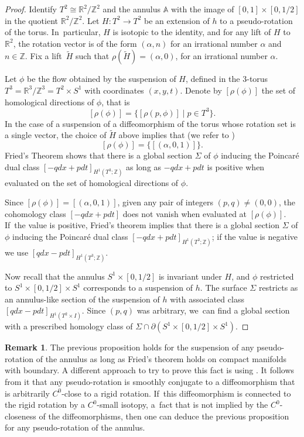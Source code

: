 \documentclass[10pt]{amsart}
\theoremstyle{definition}
\newtheorem{Remark}[theorem]{Remark}
\begin{document}
\begin{proof}
Identify $T^2\cong \mathbb{R}^2/\mathbb{Z}^2$ and the annulus $\mathbb{A}$ with the image of $[0,1]\times [0,1/2]$ in the quotient $\mathbb{R}^2/\mathbb{Z}^2$. Let $H: T^2 \to T^2$
be an extension of $h$ to a pseudo-rotation of the torus. In~particular, $H$ is isotopic to the identity, and for any lift of $H$ to $\mathbb{R}^2$, the rotation vector is of the form $(\alpha,n)$ for an irrational number $\alpha$ and $n\in \mathbb{Z}$. Fix a lift~$\widetilde H$ such that $\rho(\widetilde H)=(\alpha,0)$, for an irrational number $\alpha$.

Let $\phi$ be the flow obtained by the suspension of $H$, defined in the 3-torus $T^3=\mathbb{R}^3/\mathbb{Z}^3=T^2\times S^1$ with coordinates $(x,y,t)$.
Denote by $[\rho(\phi)]$ the set of homological directions of $\phi$, that is
\[
[\rho(\phi)]=\{ [\rho(p,\phi)]\mid p\in T^3\}.
\]
In the case of a suspension of a diffeomorphism of the torus whose rotation set is a single vector, the choice of $\widetilde H$ above implies that (we refer to \cite[Eq.\,2.2]{K1})
\[
[\rho(\phi)]=\{[(\alpha,0,1)]\}.
\]
Fried's Theorem \cite[Th.\,D]{Fr} shows that there is a global section $\Sigma$ of $\phi$ inducing the Poincaré dual class $[-qdx+pdt]_{H^1(T^3;\mathbb{Z})}$ as long as $-qdx+pdt$ is positive when evaluated on the set of homological directions of $\phi$.

{Since $[\rho(\phi)]=[(\alpha,0,1)]$}, given any pair of integers $(p,q)\neq (0,0)$, the cohomology class $[-qdx+pdt]$ does not vanish when evaluated at $[\rho(\phi)]$. If~the value is positive, Fried's theorem implies that there is a global section $\Sigma$ of $\phi$ inducing the Poincaré dual class $[-qdx+pdt]_{H^1({T}^3;\mathbb{Z})}$; if the value is negative we use $[qdx-pdt]_{H^1(T^3;\mathbb{Z})}$.

Now recall that the annulus $S^1\times [0,1/2]$ is invariant under $H$, and $\phi$ restricted to $S^1\times[0,1/2]\times S^1$ corresponds to a suspension of $h$. The surface $\Sigma$ restricts as an annulus-like section of the suspension of $h$ with associated class $[qdx-pdt]_{H^1(T^2\times I)}$. Since $(p,q)$ was arbitrary, we~can find a global section with a prescribed homology class of $\Sigma\cap \partial (S^1\times [0,1/2] \times S^1)$.
\end{proof}

\begin{Remark}
The previous proposition holds for the suspension of any pseudo-rotation of the annulus as long as Fried's theorem holds on compact manifolds with boundary. A different approach to try to prove this fact is using \cite[Prop.\,5.1]{BCLP}. It follows from it that any pseudo-rotation is smoothly conjugate to a diffeomorphism that is arbitrarily $C^0$-close to a rigid rotation. If~this diffeomorphism is connected to the rigid rotation by a $C^0$-small isotopy, a~fact that is not implied by the $C^0$-closeness of the diffeomorphisms, then one can deduce the previous proposition for any pseudo-rotation of the annulus.
\end{Remark}
\end{document}

